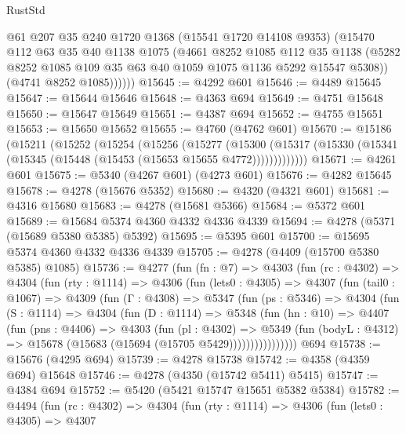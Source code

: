 \begin{lexlean}{RustStd}
\begin{coremodule}
            @61
            @207
            @35
            @240
            @1720
            @1368
            (@15541 @1720 @14108 @9353)
            (@15470
              @112
              @63
              @35
              @40
              @1138
              @1075
              (@4661
                @8252
                @1085
                @112
                @35
                @1138
                (@5282 @8252 @1085 @109 @35 @63 @40 @1059 @1075 @1136 @5292 @15547 @5308))
              (@4741 @8252 @1085))))))
@15645 := @4292 @601
@15646 := @4489 @15645
@15647 := @15644 @15646
@15648 := @4363 @694
@15649 := @4751 @15648
@15650 := @15647 @15649
@15651 := @4387 @694
@15652 := @4755 @15651
@15653 := @15650 @15652
@15655 := @4760 (@4762 @601)
@15670 := @15186
    (@15211
      (@15252
        (@15254
          (@15256
            (@15277
              (@15300
                (@15317 (@15330 (@15341 (@15345 (@15448 (@15453 (@15653 @15655 @4772)))))))))))))
@15671 := @4261 @601
@15675 := @5340 (@4267 @601) (@4273 @601)
@15676 := @4282 @15645
@15678 := @4278 (@15676 @5352)
@15680 := @4320 (@4321 @601)
@15681 := @4316 @15680
@15683 := @4278 (@15681 @5366)
@15684 := @5372 @601
@15689 := @15684 @5374 @4360 @4332 @4336 @4339
@15694 := @4278 (@5371 (@15689 @5380 @5385) @5392)
@15695 := @5395 @601
@15700 := @15695 @5374 @4360 @4332 @4336 @4339
@15705 := @4278 (@4409 (@15700 @5380 @5385) @1085)
@15736 := @4277
    (fun (fn : @7) =>
    @4303
      (fun (rc : @4302) =>
      @4304
        (fun (rty : @1114) =>
        @4306
          (fun (lets0 : @4305) =>
          @4307
            (fun (tail0 : @1067) =>
            @4309
              (fun (Γ : @4308) =>
              @5347
                (fun (ps : @5346) =>
                @4304
                  (fun (S : @1114) =>
                  @4304
                    (fun (D : @1114) =>
                    @5348
                      (fun (hn : @10) =>
                      @4407
                        (fun (pns : @4406) =>
                        @4303
                          (fun (pl : @4302) =>
                          @5349
                            (fun (bodyL : @4312) =>
                            @15678 (@15683 (@15694 (@15705 @5429))))))))))))))))
    @694
@15738 := @15676 (@4295 @694)
@15739 := @4278 @15738
@15742 := @4358 (@4359 @694) @15648
@15746 := @4278 (@4350 (@15742 @5411) @5415)
@15747 := @4384 @694
@15752 := @5420 (@5421 @15747 @15651 @5382 @5384)
@15782 := @4494
    (fun (rc : @4302) =>
    @4304
      (fun (rty : @1114) =>
      @4306
        (fun (lets0 : @4305) =>
        @4307

\end{coremodule}
\end{lexlean}
